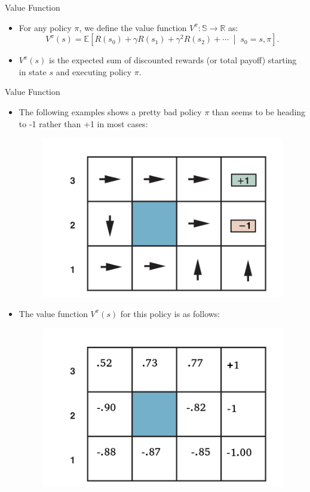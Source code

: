 \documentclass[handout]{beamer}
\begin{document}
\begin{frame}{Value Function}
\scriptsize
\begin{itemize}
    \item  For any policy \( \pi \), we define the value function $V^{\pi}: \mathbb{S} \rightarrow \mathbb{R}$ as:
    \[
    V^{\pi}(s) = \mathbb{E}\left[R(s_0) + \gamma R(s_1) + \gamma^2 R(s_2) + \cdots \;\middle|\; s_0 = s, \pi\right].
    \]
    \item \( V^{\pi}(s) \) is the expected sum of discounted rewards (or total payoff) starting in state \( s \) and executing policy \( \pi \).
\end{itemize}
\end{frame}

\begin{frame}{Value Function}
\scriptsize
\begin{itemize}
    \item  The following examples shows a pretty bad policy \( \pi \) than seems to be heading to -1 rather than +1 in most cases:
\begin{figure}[h]
        	\includegraphics[scale = 0.4]{pics/example3.png}
        \end{figure}
    \item The value function \( V^{\pi}(s) \) for this policy is as follows:
    
\begin{figure}[h]
        	\includegraphics[scale = 0.4]{pics/example4.png}
        \end{figure}
\end{itemize}
\end{frame}
\end{document}
